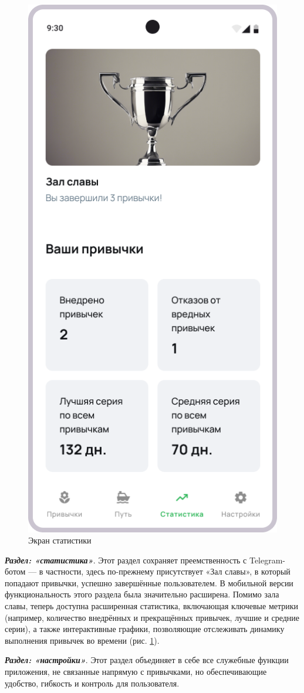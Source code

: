 \documentclass[pdflatex,sn-mathphys-num]{sn-jnl}%
\theoremstyle{thmstyleone}%
\theoremstyle{thmstyletwo}%
\theoremstyle{thmstylethree}%
\begin{document}
\medskip

\begin{figure}
    \centering
    \includegraphics[width=0.5\linewidth]{figures/App/Stat.png}
    \caption{Экран статистики}
    \label{fig:Stat}
\end{figure}

\textbf{\textit{Раздел: «статистика»}}. Этот раздел сохраняет преемственность с Telegram-ботом — в частности, здесь по-прежнему присутствует «Зал славы», в который попадают привычки, успешно завершённые пользователем. В мобильной версии функциональность этого раздела была значительно расширена. Помимо зала славы, теперь доступна расширенная статистика, включающая ключевые метрики (например, количество внедрённых и прекращённых привычек, лучшие и средние серии), а также интерактивные графики, позволяющие отслеживать динамику выполнения привычек во времени (рис. \ref{fig:Stat}).

\medskip

\textbf{\textit{Раздел: «настройки»}}. Этот раздел объединяет в себе все служебные функции приложения, не связанные напрямую с привычками, но обеспечивающие удобство, гибкость и контроль для пользователя.
\end{document}
